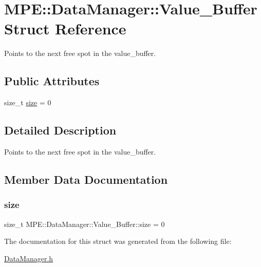 \hypertarget{struct_m_p_e_1_1_data_manager_1_1_value___buffer}{}\section{M\+PE\+:\+:Data\+Manager\+:\+:Value\+\_\+\+Buffer Struct Reference}
\label{struct_m_p_e_1_1_data_manager_1_1_value___buffer}


Points to the next free spot in the value\+\_\+buffer.  


\subsection*{Public Attributes}
\begin{DoxyCompactItemize}
\item 
size\+\_\+t \hyperlink{struct_m_p_e_1_1_data_manager_1_1_value___buffer_af3df472f11853bea90cd105dc5278139}{size} = 0
\end{DoxyCompactItemize}


\subsection{Detailed Description}
Points to the next free spot in the value\+\_\+buffer. 

\subsection{Member Data Documentation}
\mbox{\label{struct_m_p_e_1_1_data_manager_1_1_value___buffer_af3df472f11853bea90cd105dc5278139}} 
\subsubsection{\texorpdfstring{size}{size}}
{\footnotesize\ttfamily size\+\_\+t M\+P\+E\+::\+Data\+Manager\+::\+Value\+\_\+\+Buffer\+::size = 0}



The documentation for this struct was generated from the following file\+:\begin{DoxyCompactItemize}
\item 
\hyperlink{_data_manager_8h}{Data\+Manager.\+h}\end{DoxyCompactItemize}
